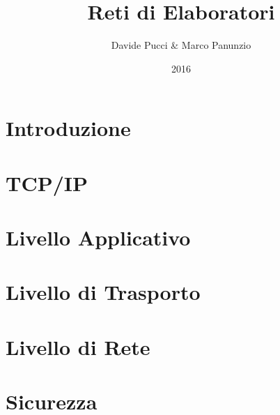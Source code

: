 

\title{Reti di Elaboratori}
\author{Davide Pucci \& Marco Panunzio}
\date{2016}



\maketitle

\tableofcontents

\chapter{Introduzione}


\chapter{TCP/IP}


\chapter{Livello Applicativo}


\chapter{Livello di Trasporto}


\chapter{Livello di Rete}


\chapter{Sicurezza}


